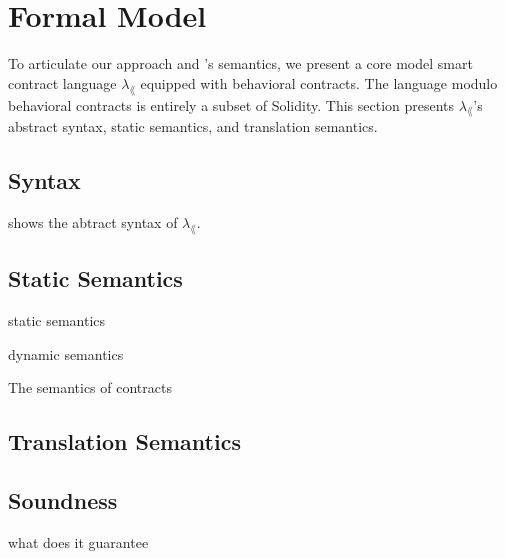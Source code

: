 \section{Formal Model} \label{sec:model}

To articulate our approach and \lang's semantics, we present a core model
smart contract language $\lambda_\lang$ equipped with
behavioral contracts. The language modulo behavioral
contracts is entirely a subset of Solidity.
This section presents $\lambda_\lang$'s abstract syntax, static semantics, and
translation semantics.

\subsection{Syntax}



 shows the abtract syntax of $\lambda_\lang$.

\subsection{Static Semantics}

static semantics

dynamic semantics

The semantics of contracts

\subsection{Translation Semantics}

\subsection{Soundness}

what does it guarantee

